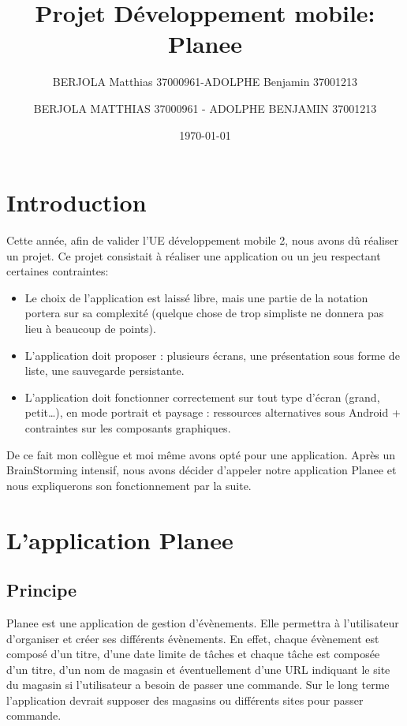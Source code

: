 \documentclass[12pt,a4paper]{report}
\author{BERJOLA Matthias 37000961-ADOLPHE Benjamin 37001213}           %
\begin{document}
\title{Projet Développement mobile: Planee}
\author{BERJOLA MATTHIAS 37000961 - ADOLPHE BENJAMIN 37001213}
\date{\today} 

\maketitle


\newpage

\tableofcontents
  
\chapter{Introduction}  
\begin{flushleft}
\justify
Cette année, afin de valider l'UE développement mobile 2, nous avons dû réaliser un projet. Ce projet consistait à réaliser une application ou un jeu respectant certaines contraintes:
\begin{itemize}
\item Le choix de l'application est laissé libre, mais une partie de la notation portera sur sa complexité (quelque chose de trop simpliste ne donnera pas lieu à beaucoup de points).
\item L’application doit proposer : plusieurs écrans, une présentation
sous forme de liste, une sauvegarde persistante.
\item L’application doit fonctionner correctement sur tout type d’écran (grand, petit…), en mode portrait et paysage : ressources alternatives sous Android + contraintes sur les composants graphiques.
\end{itemize}
De ce fait mon collègue et moi même avons opté pour une application. Après un BrainStorming intensif, nous avons décider d'appeler notre application Planee et nous expliquerons son fonctionnement par la suite.
\end{flushleft}

\newpage
\chapter{L'application Planee}
\section{Principe}
\begin{flushleft}
\justify
Planee est une application de gestion d'évènements. Elle permettra à l'utilisateur d'organiser et créer ses différents évènements. En effet, chaque évènement est composé d'un titre, d'une date limite de tâches et chaque tâche est composée d'un titre, d'un nom de magasin et éventuellement d'une URL indiquant le site du magasin si l'utilisateur a besoin de passer une commande. Sur le long terme l'application devrait supposer des magasins ou différents sites pour passer commande.
\end{flushleft}
\end{document}
